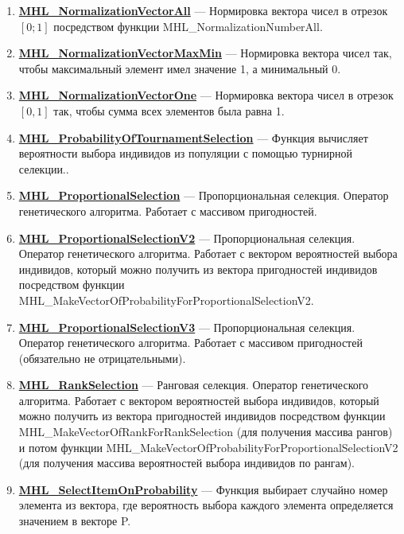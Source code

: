\documentclass[a4paper,12pt]{article}
\begin{document}
\begin{enumerate}
\item \textbf{\hyperref[MHL_NormalizationVectorAll]{MHL\_NormalizationVectorAll}} --- Нормировка вектора чисел в отрезок $[0;1]$ посредством функции MHL\_NormalizationNumberAll.

\item \textbf{\hyperref[MHL_NormalizationVectorMaxMin]{MHL\_NormalizationVectorMaxMin}} --- Нормировка вектора чисел так, чтобы максимальный элемент имел значение 1, а минимальный 0.

\item \textbf{\hyperref[MHL_NormalizationVectorOne]{MHL\_NormalizationVectorOne}} --- Нормировка вектора чисел в отрезок $[0,1]$ так, чтобы сумма всех элементов была равна 1.

\item \textbf{\hyperref[MHL_ProbabilityOfTournamentSelection]{MHL\_ProbabilityOfTournamentSelection}} --- Функция вычисляет вероятности выбора индивидов из популяции с помощью турнирной селекции..

\item \textbf{\hyperref[MHL_ProportionalSelection]{MHL\_ProportionalSelection}} --- Пропорциональная селекция. Оператор генетического алгоритма. Работает с массивом пригодностей.

\item \textbf{\hyperref[MHL_ProportionalSelectionV2]{MHL\_ProportionalSelectionV2}} --- Пропорциональная селекция. Оператор генетического алгоритма. Работает с вектором вероятностей выбора индивидов, который можно получить из вектора пригодностей индивидов посредством функции MHL\_MakeVectorOfProbabilityForProportionalSelectionV2.

\item \textbf{\hyperref[MHL_ProportionalSelectionV3]{MHL\_ProportionalSelectionV3}} --- Пропорциональная селекция. Оператор генетического алгоритма. Работает с массивом пригодностей (обязательно не отрицательными).

\item \textbf{\hyperref[MHL_RankSelection]{MHL\_RankSelection}} --- Ранговая селекция. Оператор генетического алгоритма. Работает с вектором вероятностей выбора индивидов, который можно получить из вектора пригодностей индивидов посредством функции MHL\_MakeVectorOfRankForRankSelection (для получения массива рангов) и потом функции MHL\_MakeVectorOfProbabilityForProportionalSelectionV2 (для получения массива вероятностей выбора индивидов по рангам).

\item \textbf{\hyperref[MHL_SelectItemOnProbability]{MHL\_SelectItemOnProbability}} --- Функция выбирает случайно номер элемента из вектора, где вероятность выбора каждого элемента определяется значением в векторе P.


\end{enumerate}
\end{document}
